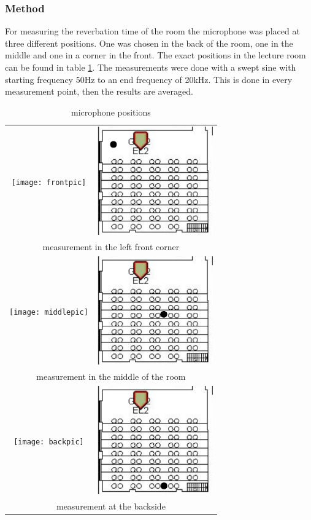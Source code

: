 \documentclass{article}
\begin{document}
\subsubsection{Method}
For measuring the reverbation time of the room the microphone was placed at three different positions. One was chosen in the back of the room, one in the middle and one in a corner in the front. The exact positions in the lecture room can be found in table \ref{tab:revmeasure}. The measurements were done with a swept sine with starting frequency 50Hz to an end frequency of 20kHz. This is done in every measurement point, then the results are averaged.
\begin{table}
\begin{center}
\begin{tabular}{|c c|}
\hline
\texttt{[image: frontpic]} & \includegraphics[width=5cm,keepaspectratio=true]{front}\\
\multicolumn{2}{|c|}{measurement in the left front corner}\\
\hline
\texttt{[image: middlepic]} & \includegraphics[width=5cm,keepaspectratio=true]{middle}\\
\multicolumn{2}{|c|}{measurement in the middle of the room}\\
\hline
\texttt{[image: backpic]} & \includegraphics[width=5cm,keepaspectratio=true]{back}\\
\multicolumn{2}{|c|}{measurement at the backside}\\
\hline
\end{tabular}
\caption{microphone positions}
\label{tab:revmeasure}
\end{center}
\end{table}
\end{document}
